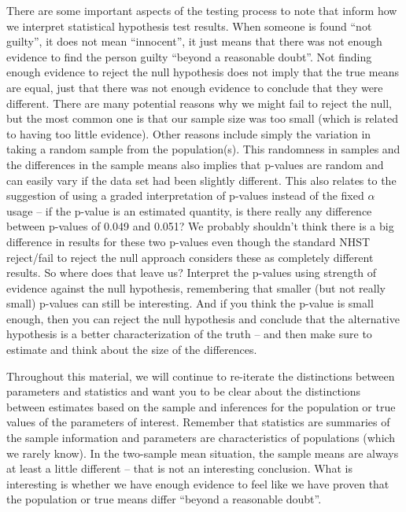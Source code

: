 \documentclass[
]{book}
\begin{document}
\indent There are some important aspects of the testing process to note that inform
how we interpret statistical hypothesis test results. When someone is found
``not guilty'', it does not mean ``innocent'', it just means that there was not
enough evidence to find the person guilty ``beyond a reasonable doubt''.
Not finding enough evidence to reject the null hypothesis does not imply
that the true means are equal, just that there was not enough evidence to
conclude that they were different. There are many potential reasons why we
might fail to reject the null, but the most common one is that our sample
size was too small (which is related to having too little evidence). Other
reasons include simply the variation in taking a random sample  from the
population(s). This randomness in samples and the differences in the sample
means also implies that p-values are random and can easily vary if the data set
had been slightly different. This also relates to the suggestion of using a
graded interpretation of p-values instead of the fixed \(\alpha\) usage -- if the p-value is an estimated quantity,
is there really any difference between p-values of 0.049 and 0.051? We
probably shouldn't think there is a big difference in results for these two
p-values even though the standard NHST reject/fail to reject the null approach
considers these as completely different results. So where does that leave us?
Interpret the p-values
using strength of evidence against the null hypothesis,
remembering that smaller (but not really small) p-values can still be
interesting. And if you think the p-value is small enough, then you can reject
the null hypothesis and conclude that the alternative hypothesis is a better characterization of the truth -- and then make sure to estimate and think about the size of the differences.

\indent Throughout this material, we will continue to re-iterate the distinctions
between parameters and statistics and want you to be clear about the
distinctions between estimates based on the sample and inferences for the
population or true values of the parameters of interest. Remember that
statistics are summaries of the sample information and parameters are
characteristics of populations (which we rarely know). In the two-sample
mean situation, the sample means are always at least a little different
-- that is not an interesting conclusion. What is interesting is whether
we have enough evidence to feel like we have proven that the population or true means
differ ``beyond a reasonable doubt''.
\end{document}
